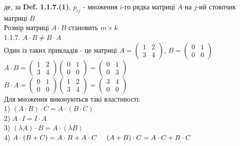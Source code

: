 \documentclass[a4paper, 10pt]{article}
\theoremstyle{theoremdd}
\begin{document}
	де, за \textbf{Def. 1.1.7.(1)}, $p_{ij}$ - множення $i$-го рядка матриці $A$ на $j$-ий стовпчик матриці $B$\\
	Розмір матриці $A \cdot B$ становить $m \times k$
	\bigskip \\
	\rm{1.1.7.} $A \cdot B \neq B \cdot A$\\
	Один із таких прикладів - це матриці $A = \begin{pmatrix}
	1 & 2 \\
	3 & 4
	\end{pmatrix}$, $B = \begin{pmatrix}
	0 & 1 \\
	0 & 0
\end{pmatrix}$\\
$A \cdot B = \begin{pmatrix} 1 & 2 \\ 3 & 4 \end{pmatrix} \begin{pmatrix} 0 & 1 \\ 0 & 0 \end{pmatrix} = \begin{pmatrix} 0 & 1 \\ 0 & 3 
\end{pmatrix}$\\
$B \cdot A = \begin{pmatrix} 0 & 1 \\ 0 & 0 \end{pmatrix} \begin{pmatrix} 1 & 2 \\ 3 & 4 \end{pmatrix} = \begin{pmatrix} 3 & 4 \\ 0 & 0 
\end{pmatrix}$
	\bigskip \\
	Для множення виконуються такі властивості:\\
	1) $(A \cdot B) \cdot C = A \cdot (B \cdot C)$\\
	2) $A \cdot I = I \cdot A$\\
	3) $(\lambda A) \cdot B = A \cdot (\lambda B)$\\
	4) $A \cdot (B+C) = A\cdot B + A\cdot C \hspace{0.5 cm} (A+B)\cdot C = A\cdot C + B \cdot C$\\
	\proof
\end{document}
